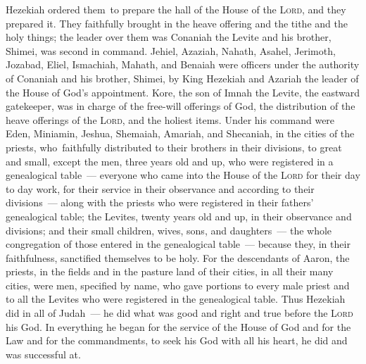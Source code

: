 \begin{inparaenum}
   Hezekiah ordered them\understood\ to prepare the hall of the House of the \textsc{Lord}, and they prepared it.\understood%
   They faithfully brought in the heave offering and the tithe and the holy things; the leader over them was Conaniah the Levite and his brother, Shimei, was second in command.\understood%
   Jehiel, Azaziah, Nahath, Asahel, Jerimoth, Jozabad, Eliel, Ismachiah, Mahath, and Benaiah were officers under the authority of Conaniah and his brother, Shimei, by King Hezekiah and Azariah the leader of the House of God's appointment.%
   Kore, the son of Imnah the Levite, the eastward gatekeeper, was in charge of the free-will offerings of God, the distribution of the heave offerings of the \textsc{Lord}, and the holiest items.%
   Under his command were Eden, Miniamin, Jeshua, Shemaiah, Amariah, and Shecaniah, in the cities of the priests, who\understood\ faithfully distributed to their brothers in their divisions, to great and small,%
   except the men, three years old and up, who were registered in a genealogical table~--- everyone who came into the House of the \textsc{Lord} for their day to day work, for their service in their observance and according to their divisions~---%
   along with the priests who were registered in their fathers' genealogical table; the Levites, twenty years old and up, in their observance and divisions;%
   and their small children, wives, sons, and daughters~--- the whole congregation of those entered in the genealogical table~--- because they, in their faithfulness, sanctified themselves to be holy.%
   For the descendants of Aaron, the priests, in the fields and in the pasture land of their cities, in all their many cities, were men, specified by name, who gave portions to every male priest and to all the Levites who were registered in the genealogical table.%
   Thus Hezekiah did in all of Judah~--- he did what was good and right and true before the \textsc{Lord} his God.%
   In everything he began for the service of the House of God and for the Law and for the commandments, to seek his God with all his heart, he did and was successful at.\understood%
\end{inparaenum}
